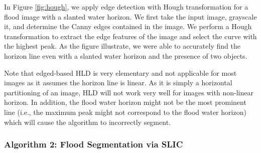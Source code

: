 \documentclass[review]{elsarticle}
\begin{document}
In Figure \ref{fig:hough}, we apply edge detection with Hough transformation for a flood image with a slanted water horizon. We first take the input image, grayscale it, and determine the Canny edges contained in the image. We perform a Hough transformation to extract the edge features of the image and select the curve with the highest peak. As the figure illustrate, we were able to accurately find the horizon line even with a slanted water horizon and the presence of two objects. 

Note that edged-based HLD is very elementary and not applicable for most images as it assumes the horizon line is linear. As it is simply a horizontal partitioning of an image, HLD will not work very well for images with non-linear horizon. In addition, the flood water horizon might not be the most prominent line (i.e., the maximum peak might not correspond to the flood water horizon) which will cause the algorithm to incorrectly segment.

\subsubsection{Algorithm 2: Flood Segmentation via SLIC}
\end{document}
